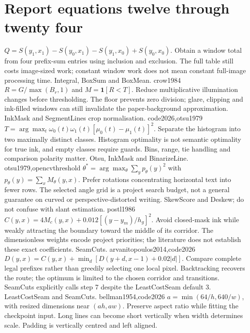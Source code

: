 \section{Report equations twelve through twenty four}
{$Q=S(y_1,x_1)-S(y_0,x_1)-S(y_1,x_0)+S(y_0,x_0)$.}
{Obtain a window total from four prefix-sum entries using inclusion and
exclusion. The full table still costs image-sized work; constant window work
does not mean constant full-image processing time.}
{Integral, BoxSum and BoxMean.}
{crow1984}
{$R=G/\max(B_r,1)$ and $M=\mathbf1[R<T]$.}
{Reduce multiplicative illumination changes before thresholding. The floor
prevents zero division; glare, clipping and ink-filled windows can still
invalidate the paper-background approximation.}
{InkMask and SegmentLines crop normalisation.}
{code2026,otsu1979}
{$T=\arg\max_t\omega_0(t)\omega_1(t)[\mu_0(t)-\mu_1(t)]^2$.}
{Separate the histogram into two maximally distinct classes. Histogram
optimality is not semantic optimality for true ink, and empty classes require
guards. Bins, range, tie handling and comparison polarity matter.}
{Otsu, InkMask and BinarizeLine.}
{otsu1979,opencvthreshold}
{$\theta^*=\arg\max_\theta\sum_y p_\theta(y)^2$ with
$p_\theta(y)=\sum_x M_\theta(y,x)$.}
{Prefer rotations concentrating horizontal text into fewer rows. The selected
angle grid is a project search budget, not a general guarantee on curved or
perspective-distorted writing.}
{SkewScore and Deskew; do not confuse with slant estimation.}
{postl1986}
{$C(y,x)=4M_c(y,x)+0.012[(y-y_m)/h_g]^2$.}
{Avoid closed-mask ink while weakly attracting the boundary toward the middle
of its corridor. The dimensionless weights encode project priorities; the
literature does not establish these exact coefficients.}
{SeamCuts.}
{arvanitopoulos2014,code2026}
{$D(y,x)=C(y,x)+\min_d[D(y+d,x-1)+0.02|d|]$.}
{Compare complete legal prefixes rather than greedily selecting one local
pixel. Backtracking recovers the route; the optimum is limited to the chosen
corridor and transitions. SeamCuts explicitly calls step 7 despite the
LeastCostSeam default 3.}
{LeastCostSeam and SeamCuts.}
{bellman1954,code2026}
{$a=\min(64/h,640/w)$, with resized dimensions near $(ah,aw)$.}
{Preserve aspect ratio while fitting the checkpoint input. Long lines can
become short vertically when width determines scale. Padding is vertically
centred and left aligned.}
